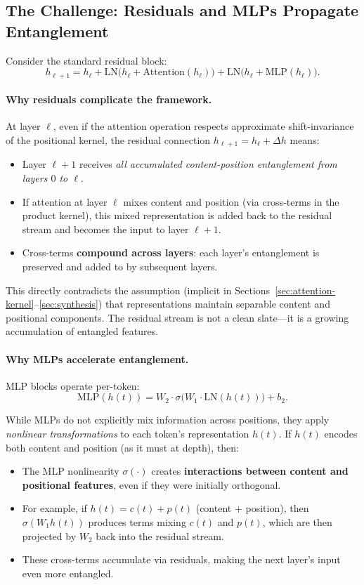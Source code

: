 \documentclass[11pt]{article}
\theoremstyle{definition}
\begin{document}
\subsection{The Challenge: Residuals and MLPs Propagate Entanglement}

Consider the standard residual block:
\[
h_{\ell+1} = h_\ell + \text{LN}\big(h_\ell + \text{Attention}(h_\ell)\big) + \text{LN}\big(h_\ell + \text{MLP}(h_\ell)\big).
\]

\paragraph{Why residuals complicate the framework.}
At layer $\ell$, even if the attention operation respects approximate shift-invariance of the positional kernel, the residual connection $h_{\ell+1} = h_\ell + \Delta h$ means:
\begin{itemize}
    \item Layer $\ell+1$ receives \emph{all accumulated content-position entanglement from layers $0$ to $\ell$}.
    \item If attention at layer $\ell$ mixes content and position (via cross-terms in the product kernel), this mixed representation is added back to the residual stream and becomes the input to layer $\ell+1$.
    \item Cross-terms \textbf{compound across layers}: each layer's entanglement is preserved and added to by subsequent layers.
\end{itemize}

This directly contradicts the assumption (implicit in Sections~\ref{sec:attention-kernel}--\ref{sec:synthesis}) that representations maintain separable content and positional components. The residual stream is not a clean slate---it is a growing accumulation of entangled features.

\paragraph{Why MLPs accelerate entanglement.}
MLP blocks operate per-token:
\[
\text{MLP}(h(t)) = W_2 \cdot \sigma\big(W_1 \cdot \text{LN}(h(t))\big) + b_2.
\]

While MLPs do not explicitly mix information across positions, they apply \emph{nonlinear transformations} to each token's representation $h(t)$. If $h(t)$ encodes both content and position (as it must at depth), then:
\begin{itemize}
    \item The MLP nonlinearity $\sigma(\cdot)$ creates \textbf{interactions between content and positional features}, even if they were initially orthogonal.
    \item For example, if $h(t) = c(t) + p(t)$ (content + position), then $\sigma(W_1 h(t))$ produces terms mixing $c(t)$ and $p(t)$, which are then projected by $W_2$ back into the residual stream.
    \item These cross-terms accumulate via residuals, making the next layer's input even more entangled.
\end{itemize}
\end{document}
